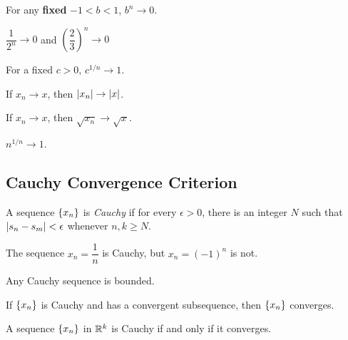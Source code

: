 \documentclass{article}
\begin{document}
\begin{theorem}
  For any \textbf{fixed} $-1 < b < 1$, $b^n \to 0$.
\end{theorem}

\begin{example}
  $\dfrac{1}{2^n} \to 0$ and $\left(\dfrac{2}{3}\right)^n \to 0$
\end{example}

\begin{theorem}
  For a fixed $c > 0$, $c^{1/n} \to 1$.
\end{theorem}

\begin{theorem}
  If $x_n \to x$, then $\abs{x_n} \to \abs{x}$.
\end{theorem}

\begin{theorem}
  If $x_n \to x$, then $\sqrt{x_n} \to \sqrt{x}$.
\end{theorem}

\begin{theorem}
  $n^{1/n} \to 1$.
\end{theorem}

\subsection{Cauchy Convergence Criterion}

\begin{definition}
  A sequence $\{x_n\}$ is \emph{Cauchy} if for every $\epsilon > 0$, there is an integer $N$ such that $\abs{s_n - s_m} < \epsilon$ whenever $n, k \geq N$.
\end{definition}

\begin{example}
  The sequence $x_n = \dfrac{1}{n}$ is Cauchy, but $x_n = (-1)^n$ is not.
\end{example}

\begin{theorem}
  Any Cauchy sequence is bounded.
\end{theorem}

\begin{theorem}
  If $\{x_n\}$ is Cauchy and has a convergent subsequence, then $\{x_n\}$ converges.
\end{theorem}

\begin{theorem}
  A sequence $\{x_n\}$ in $\mathbb{R}^k$ is Cauchy if and only if it converges.
\end{theorem}
\end{document}
